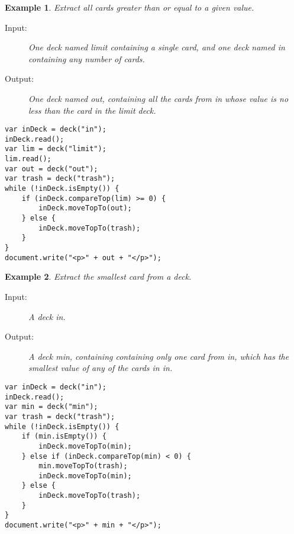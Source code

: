 \documentclass[a4paper,twoside]{tufte-handout}
\newtheorem{example}{Example}
\begin{document}
\begin{example}\label{extractge}
  Extract all cards greater than or equal to a given value.
  \begin{description}
  \item[Input:] One deck named \emph{limit} containing a single card,
    and one deck named \emph{in} containing any number of cards.
  \item[Output:] One deck named \emph{out}, containing all the cards
    from \emph{in} whose value is no less than the card in the
    \emph{limit} deck.
 \end{description}
\begin{lstlisting}
var inDeck = deck("in");
inDeck.read();
var lim = deck("limit");
lim.read();
var out = deck("out");
var trash = deck("trash");
while (!inDeck.isEmpty()) {
    if (inDeck.compareTop(lim) >= 0) {
        inDeck.moveTopTo(out);
    } else {
        inDeck.moveTopTo(trash);
    }
}
document.write("<p>" + out + "</p>");
\end{lstlisting}
\end{example}

\clearpage

\begin{example}\label{extractsmallest}
  Extract the smallest card from a deck.
  \begin{description}
  \item[Input:] A deck \emph{in}.
  \item[Output:] A deck \emph{min}, containing containing only one
    card from \emph{in}, which has the smallest value of any of the
    cards in \emph{in}.
 \end{description}
\begin{lstlisting}
var inDeck = deck("in");
inDeck.read();
var min = deck("min");
var trash = deck("trash");
while (!inDeck.isEmpty()) {
    if (min.isEmpty()) {
        inDeck.moveTopTo(min);
    } else if (inDeck.compareTop(min) < 0) {
        min.moveTopTo(trash);
        inDeck.moveTopTo(min);
    } else {
        inDeck.moveTopTo(trash);
    }
}
document.write("<p>" + min + "</p>");
\end{lstlisting}
\end{example}
\end{document}
